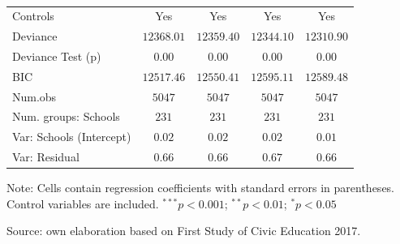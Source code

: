 \documentclass[
  12pt,
  letterpaper,
]{article}
\begin{document}
\begin{table}
{\begin{center}
{\begin{threeparttable}
\begin{tabular}{l c c c c}
\midrule
Controls                                  & Yes           & Yes           & Yes           & Yes           \\
Deviance                                  & $12368.01$    & $12359.40$    & $12344.10$    & $12310.90$    \\
Deviance Test (p)                         & $0.00$        & $0.00$        & $0.00$        & $0.00$        \\
BIC                                       & $12517.46$    & $12550.41$    & $12595.11$    & $12589.48$    \\
Num.obs                                   & $5047$        & $5047$        & $5047$        & $5047$        \\
Num. groups: Schools                      & $231$         & $231$         & $231$         & $231$         \\
Var: Schools (Intercept)                  & $0.02$        & $0.02$        & $0.02$        & $0.01$        \\
Var: Residual                             & $0.66$        & $0.66$        & $0.67$        & $0.66$        \\
\bottomrule
\end{tabular}
\begin{tablenotes}[flushleft]
\scriptsize{\item Note: Cells contain regression coefficients with standard errors in parentheses. Control variables are included. $^{***}p<0.001$; $^{**}p<0.01$; $^{*}p<0.05$ \\ \item Source: own elaboration based on First Study of Civic Education 2017.}
\end{tablenotes}
\end{threeparttable}
}
\caption{}
\label{table:coefficients}
\end{center}

}

\end{table}%
\end{document}
